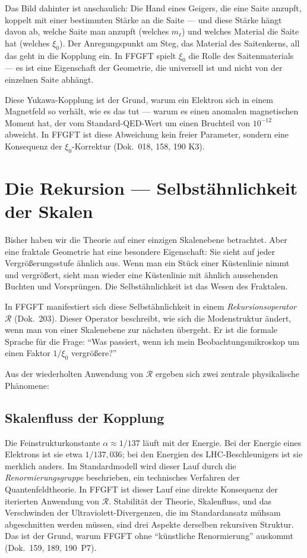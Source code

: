 Das Bild dahinter ist anschaulich: Die Hand eines Geigers, die eine
Saite anzupft, koppelt mit einer bestimmten Stärke an die Saite ---
und diese Stärke hängt davon ab, welche Saite man anzupft (welches
$m_\ell$) und welches Material die Saite hat (welches $\xi_0$). Der
Anregungspunkt am Steg, das Material des Saitenkerns, all das geht
in die Kopplung ein. In FFGFT spielt $\xi_0$ die Rolle des
Saitenmaterials --- es ist eine Eigenschaft der Geometrie, die
universell ist und nicht von der einzelnen Saite abhängt.

Diese Yukawa-Kopplung ist der Grund, warum ein Elektron sich in
einem Magnetfeld so verhält, wie es das tut --- warum es einen
anomalen magnetischen Moment hat, der vom Standard-QED-Wert um
einen Bruchteil von $10^{-12}$ abweicht. In FFGFT ist diese
Abweichung kein freier Parameter, sondern eine Konsequenz der
$\xi_0$-Korrektur (Dok.~018, 158, 190 K3).

\section{Die Rekursion --- Selbstähnlichkeit der Skalen}

Bisher haben wir die Theorie auf einer einzigen Skalenebene
betrachtet. Aber eine fraktale Geometrie hat eine besondere
Eigenschaft: Sie sieht auf jeder Vergrößerungsstufe ähnlich aus.
Wenn man ein Stück einer Küstenlinie nimmt und vergrößert, sieht
man wieder eine Küstenlinie mit ähnlich aussehenden Buchten und
Vorsprüngen. Die Selbstähnlichkeit ist das Wesen des Fraktalen.

In FFGFT manifestiert sich diese Selbstähnlichkeit in einem
\emph{Rekursionsoperator} $\mathcal{R}$ (Dok.~203). Dieser Operator
beschreibt, wie sich die Modenstruktur ändert, wenn man von einer
Skalenebene zur nächsten übergeht. Er ist die formale Sprache für
die Frage: \enquote{Was passiert, wenn ich mein Beobachtungsmikroskop
um einen Faktor $1/\xi_0$ vergrößere?}

Aus der wiederholten Anwendung von $\mathcal{R}$ ergeben sich zwei
zentrale physikalische Phänomene:

\subsection*{Skalenfluss der Kopplung}
Die Feinstrukturkonstante $\alpha \approx 1/137$ läuft mit der
Energie. Bei der Energie eines Elektrons ist sie etwa $1/137{,}036$;
bei den Energien des LHC-Beschleunigers ist sie merklich anders. Im
Standardmodell wird dieser Lauf durch die \emph{Renormierungsgruppe}
beschrieben, ein technisches Verfahren der Quantenfeldtheorie. In
FFGFT ist dieser Lauf eine direkte Konsequenz der iterierten
Anwendung von $\mathcal{R}$. Stabilität der Theorie, Skalenfluss,
und das Verschwinden der Ultraviolett-Divergenzen, die im
Standardansatz mühsam abgeschnitten werden müssen, sind drei
Aspekte derselben rekursiven Struktur. Das ist der Grund, warum
FFGFT ohne \enquote{künstliche Renormierung} auskommt (Dok.~159, 189,
190~P7).

